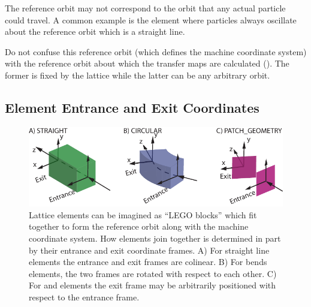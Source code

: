 The reference orbit may not correspond to the orbit that any actual particle could travel.
A common example is the  element where particles always oscillate about the reference
orbit which is a straight line.

Do not confuse this reference orbit (which defines the machine coordinate system) with the reference
orbit about which the transfer maps are calculated (). The former is fixed by the
lattice while the latter can be any arbitrary orbit.

\subsection{Element Entrance and Exit Coordinates}
\label{s:ent.exi}


  \begin{figure}[tb]
  \centering
  \includegraphics[width=5in]{ele-coord-frame.pdf}
\caption[Lattice elements as LEGO blocks.]{Lattice elements can be imagined as ``LEGO blocks'' which
fit together to form the reference orbit along with the machine coordinate system. How elements
join together is determined in part by their entrance and exit coordinate frames. A) For
straight line elements the entrance and exit frames are colinear. B) For bends elements, the two
frames are rotated with respect to each other. C) For  and  elements the
exit frame may be arbitrarily positioned with respect to the entrance frame.}
  \label{f:ele.coord.frame}
  \end{figure}


